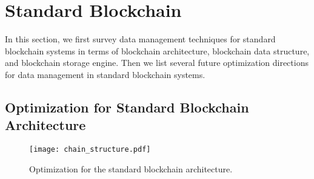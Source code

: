 \documentclass[acmsmall]{acmart}
\begin{document}
%
%
%
%
%
%



\section{Standard Blockchain}
\label{sec:standard}

 In this section, we first survey data management techniques for standard blockchain systems in terms of blockchain architecture, blockchain data structure, and blockchain storage engine. Then we list several future optimization directions for data management in standard blockchain systems.


\subsection{Optimization for Standard Blockchain Architecture}

\begin{figure}[h]
  \centering
  \texttt{[image: chain\_structure.pdf]}
  \caption{Optimization for the standard blockchain architecture.}
  \label{pic2}
\end{figure}
\end{document}

